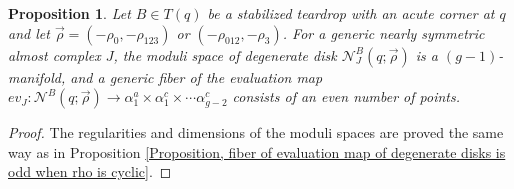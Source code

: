 \documentclass{amsart}
\newtheorem{prop}[thm]{Proposition}
\theoremstyle{definition}
\theoremstyle{remark}
\numberwithin{equation}{section}
\numberwithin{equation}{section} \makeatletter
\begin{document}
\begin{prop}\label{Proposition, generic fiber of the evaluationo map is even when rho is not cyclic}
Let $B\in T(q)$ be a stabilized teardrop with an acute corner at $q$ and let $\overrightarrow{\rho}=(-\rho_0,-\rho_{123})$ or $(-\rho_{012},-\rho_{3})$. For a generic nearly symmetric almost complex $J$, the moduli space of degenerate disk $\mathcal{N}_J^B(q;\overrightarrow{\rho})$ is a $(g-1)$-manifold, and a generic fiber of the evaluation map $ev_J:\mathcal{N}^B(q;\overrightarrow{\rho})\rightarrow \alpha^a_1\times \alpha^c_1\times\cdots\alpha^c_{g-2}$ consists of an even number of points. 
\end{prop}
\begin{proof}
The regularities and dimensions of the moduli spaces are proved the same way as in Proposition \ref{Proposition, fiber of evaluation map of degenerate disks is odd when rho is cyclic}. 


\end{proof}
\end{document}
